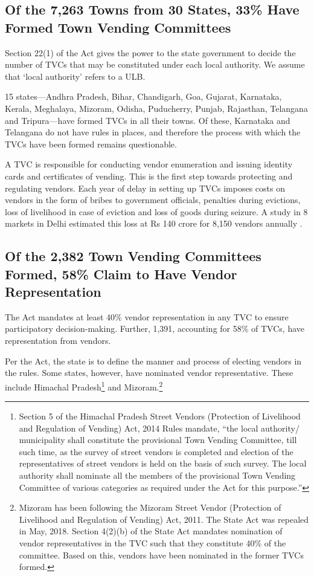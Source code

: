 \documentclass[a4paper, 12pt, twoside]{article}
\begin{document}
{\subsection*{Of the 7,263 Towns from 30 States, 33\% Have Formed Town Vending Committees}
	Section 22(1) of the Act gives the power to the state government to decide the number of TVCs that may be  constituted under each local authority. We assume that ‘local authority’ refers to a ULB.

	15 states—Andhra Pradesh, Bihar, Chandigarh, Goa, Gujarat, Karnataka, Kerala, Meghalaya, Mizoram, Odisha, Puducherry, Punjab, Rajasthan, Telangana and Tripura—have formed TVCs in all their towns. Of these, Karnataka and Telangana do not have rules in places, and therefore the process with which the TVCs have been formed remains questionable.

	A TVC is responsible for conducting vendor enumeration and issuing identity cards and certificates of vending. This is the first step towards protecting and regulating vendors. Each year of delay in setting up TVCs imposes costs on vendors in the form of bribes to government officials, penalties during evictions, loss of livelihood in case of eviction and loss of goods during seizure. A study in 8 markets in Delhi estimated this loss at Rs 140 crore for 8,150 vendors annually \parencite{rattanpaper}.

\subsection*{Of the 2,382 Town Vending Committees Formed, 58\% Claim to Have Vendor Representation}
	The Act mandates at least 40\% vendor representation in any TVC to ensure participatory decision-making. Further, 1,391, accounting for 58\% of TVCs, have representation from vendors.

	Per the Act, the state is to define the manner and process of electing vendors in the rules. Some states, however, have nominated vendor representative. These include Himachal Pradesh\footnote{Section 5 of the Himachal Pradesh Street Vendors (Protection of Livelihood and Regulation of Vending) Act, 2014 Rules mandate, “the local authority/ municipality shall constitute the provisional Town Vending Committee, till such time, as the survey of street vendors is completed and election of the representatives of street vendors is held on the basis of such survey. The local authority shall nominate all the members of the provisional Town Vending Committee of various categories as required under the Act for this purpose.”} and Mizoram.\footnote{Mizoram has been following the Mizoram Street Vendor (Protection of Livelihood and Regulation of Vending) Act, 2011. The State Act was repealed in May, 2018. Section 4(2)(b) of the State Act mandates nomination of vendor representatives in the TVC such that they constitute 40\% of the committee. Based on this, vendors have been nominated in the former TVCs formed.}

}
\end{document}
